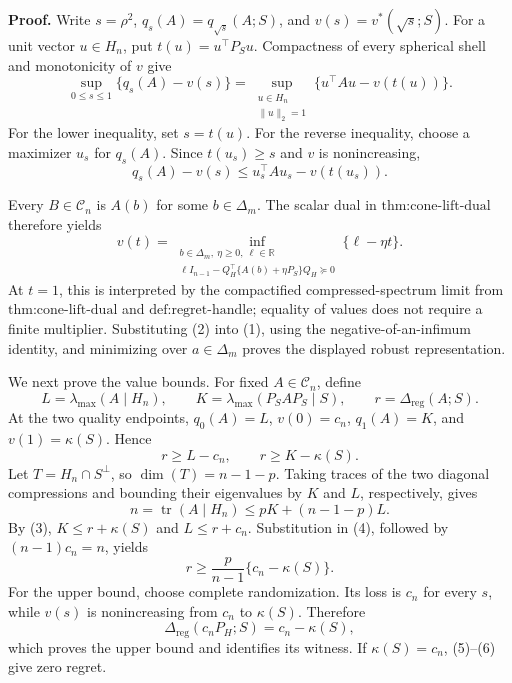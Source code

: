 \textbf{Proof.}
Write \(s=\rho^2\), \(q_s(A)=q_{\sqrt{s}}(A;S)\), and \(v(s)=v^*(\sqrt{s};S)\).  For a unit vector \(u\in H_n\), put \(t(u)=u^\top P_Su\).  Compactness of every spherical shell and monotonicity of \(v\) give
\[
\sup_{0\leq s\leq1}\{q_s(A)-v(s)\}
=\sup_{\substack{u\in H_n\\\|u\|_2=1}}
\{u^\top Au-v(t(u))\}.
\tag{1}
\]
For the lower inequality, set \(s=t(u)\).  For the reverse inequality, choose a maximizer \(u_s\) for \(q_s(A)\).  Since \(t(u_s)\geq s\) and \(v\) is nonincreasing,
\[
q_s(A)-v(s)\leq u_s^\top Au_s-v(t(u_s)).
\]

Every \(B\in\mathcal C_n\) is \(A(b)\) for some \(b\in\Delta_m\).  The scalar dual in \(\text{thm:cone-lift-dual}\) therefore yields
\[
v(t)=
\inf_{\substack{b\in\Delta_m,\ \eta\geq0,\ \ell\in\mathbb R\\
\ell I_{n-1}-Q_H^\top\{A(b)+\eta P_S\}Q_H\succeq0}}
\{\ell-\eta t\}.
\tag{2}
\]
At \(t=1\), this is interpreted by the compactified compressed-spectrum limit from \(\text{thm:cone-lift-dual}\) and \(\text{def:regret-handle}\); equality of values does not require a finite multiplier.  Substituting (2) into (1), using the negative-of-an-infimum identity, and minimizing over \(a\in\Delta_m\) proves the displayed robust representation.

We next prove the value bounds.  For fixed \(A\in\mathcal C_n\), define
\[
L=\lambda_{\max}(A\mid H_n),
\qquad
K=\lambda_{\max}(P_SAP_S\mid S),
\qquad
r=\Delta_{\mathrm{reg}}(A;S).
\]
At the two quality endpoints, \(q_0(A)=L\), \(v(0)=c_n\), \(q_1(A)=K\), and \(v(1)=\kappa(S)\).  Hence
\[
r\geq L-c_n,
\qquad
r\geq K-\kappa(S).
\tag{3}
\]
Let \(T=H_n\cap S^\perp\), so \(\dim(T)=n-1-p\).  Taking traces of the two diagonal compressions and bounding their eigenvalues by \(K\) and \(L\), respectively, gives
\[
n=\operatorname{tr}(A\mid H_n)
\leq pK+(n-1-p)L.
\tag{4}
\]
By (3), \(K\leq r+\kappa(S)\) and \(L\leq r+c_n\).  Substitution in (4), followed by \((n-1)c_n=n\), yields
\[
r\geq\frac{p}{n-1}\{c_n-\kappa(S)\}.
\tag{5}
\]
For the upper bound, choose complete randomization.  Its loss is \(c_n\) for every \(s\), while \(v(s)\) is nonincreasing from \(c_n\) to \(\kappa(S)\).  Therefore
\[
\Delta_{\mathrm{reg}}(c_nP_H;S)=c_n-\kappa(S),
\tag{6}
\]
which proves the upper bound and identifies its witness.  If \(\kappa(S)=c_n\), (5)--(6) give zero regret.

